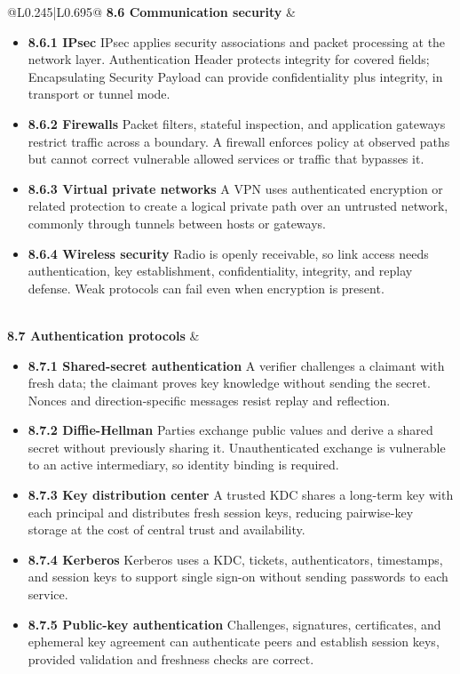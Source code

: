\documentclass[10pt,letterpaper]{article}
\begin{document}
\begin{longtable}{@{}L{0.245\textwidth}|L{0.695\textwidth}@{}}
\textbf{8.6 Communication security} & \begin{minipage}[t]{\linewidth}\raggedright \begin{itemize}\item \textbf{8.6.1 IPsec} IPsec applies security associations and packet processing at the network layer. Authentication Header protects integrity for covered fields; Encapsulating Security Payload can provide confidentiality plus integrity, in transport or tunnel mode.\item \textbf{8.6.2 Firewalls} Packet filters, stateful inspection, and application gateways restrict traffic across a boundary. A firewall enforces policy at observed paths but cannot correct vulnerable allowed services or traffic that bypasses it.\item \textbf{8.6.3 Virtual private networks} A VPN uses authenticated encryption or related protection to create a logical private path over an untrusted network, commonly through tunnels between hosts or gateways.\item \textbf{8.6.4 Wireless security} Radio is openly receivable, so link access needs authentication, key establishment, confidentiality, integrity, and replay defense. Weak protocols can fail even when encryption is present.\end{itemize}\end{minipage} \\ \hline
{}\textbf{8.7 Authentication protocols} & \begin{minipage}[t]{\linewidth}\raggedright \begin{itemize}\item \textbf{8.7.1 Shared-secret authentication} A verifier challenges a claimant with fresh data; the claimant proves key knowledge without sending the secret. Nonces and direction-specific messages resist replay and reflection.\item \textbf{8.7.2 Diffie-Hellman} Parties exchange public values and derive a shared secret without previously sharing it. Unauthenticated exchange is vulnerable to an active intermediary, so identity binding is required.\item \textbf{8.7.3 Key distribution center} A trusted KDC shares a long-term key with each principal and distributes fresh session keys, reducing pairwise-key storage at the cost of central trust and availability.\item \textbf{8.7.4 Kerberos} Kerberos uses a KDC, tickets, authenticators, timestamps, and session keys to support single sign-on without sending passwords to each service.\item \textbf{8.7.5 Public-key authentication} Challenges, signatures, certificates, and ephemeral key agreement can authenticate peers and establish session keys, provided validation and freshness checks are correct.\end{itemize}\end{minipage} \\ \hline

\end{longtable}
\end{document}
